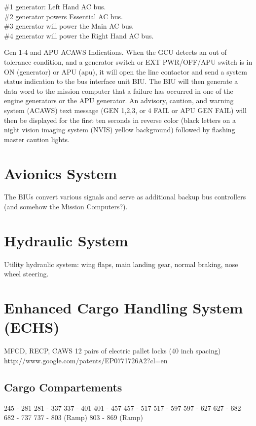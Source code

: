 \#1 generator: Left Hand AC bus.\\
\#2 generator powers Essential AC bus.\\
\#3 generator will power the Main AC bus.\\
\#4 generator will power the Right Hand AC bus.

Gen 1-4 and APU ACAWS Indications. When the GCU detects an out of tolerance condition, and a generator switch or EXT PWR/OFF/APU switch is in ON (generator) or APU (apu), it will open the line contactor and send a system status indication to the bus interface unit BIU. The
BIU will then generate a data word to the mission computer that a failure has occurred in one of the engine generators or the APU generator. An advisory, caution, and warning system (ACAWS) text message (GEN 1,2,3, or 4 FAIL or APU GEN FAIL) will then be displayed for the first ten
seconds in reverse color (black letters on a night vision imaging system (NVIS) yellow background) followed by flashing master caution lights.

\section{Avionics System}

The \gls{BIU}s convert various signals and serve as additional backup bus controllers (and somehow the Mission Computers?).

\section{Hydraulic System}

Utility hydraulic system: wing flaps, main landing gear, normal braking, nose wheel steering.

\section{Enhanced Cargo Handling System (ECHS)}
\label{sec:echs}

\gls{MFCD}, \gls{RECP}, \gls{CAWS} 12 pairs of electric pallet locks (40 inch spacing) http://www.google.com/patents/EP0771726A2?cl=en

\subsection{Cargo Compartements}

\begin{itemize}
   245 - 281
   281 - 337
   337 - 401
   401 - 457
   457 - 517
   517 - 597
   597 - 627
   627 - 682
   682 - 737
   737 - 803 (Ramp)
   803 - 869 (Ramp)
\end{itemize}

